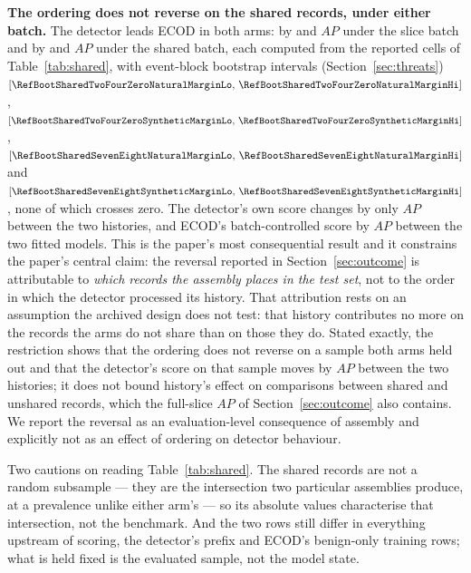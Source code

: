 \documentclass[manuscript,screen,nonacm]{acmart}
\begin{document}
\textbf{The ordering does not reverse on the shared records, under either
batch.} The detector leads ECOD in both arms: by \RevSharedMarginNatural{} and
\RevSharedMarginSynthetic{} $AP$ under the slice batch and by
\RefMarginSharedSevenEightNatural{} and \RefMarginSharedSevenEightSynthetic{} $AP$ under the
shared batch, each computed from the reported cells of
Table~\ref{tab:shared}, with event-block
bootstrap intervals (Section~\ref{sec:threats})
$[\RefBootSharedTwoFourZeroNaturalMarginLo,\,\RefBootSharedTwoFourZeroNaturalMarginHi]$,
$[\RefBootSharedTwoFourZeroSyntheticMarginLo,\,\RefBootSharedTwoFourZeroSyntheticMarginHi]$,
$[\RefBootSharedSevenEightNaturalMarginLo,\,\RefBootSharedSevenEightNaturalMarginHi]$ and
$[\RefBootSharedSevenEightSyntheticMarginLo,\,\RefBootSharedSevenEightSyntheticMarginHi]$, none
of which crosses zero. The detector's own score changes by only
\RevSharedDetectorSpread{} $AP$ between the two histories, and ECOD's
batch-controlled score by \RefEcodSharedSevenEightCrossArmSpread{} $AP$ between the two
fitted models. This is the paper's most consequential result and it constrains
the paper's central claim: the reversal reported in Section~\ref{sec:outcome}
is attributable to \emph{which records the assembly places in the test set},
not to the order in which the detector processed its history. That attribution
rests on an assumption the archived design does not test: that history
contributes no more on the records the arms do not share than on those they
do. Stated exactly, the restriction shows that the ordering does not reverse on
a sample both arms held out and that the detector's score on that sample moves
by \RevSharedDetectorSpread{} $AP$ between the two histories; it does not bound
history's effect on comparisons between shared and unshared records, which the
full-slice $AP$ of Section~\ref{sec:outcome} also contains. We report the
reversal as an evaluation-level consequence of assembly and
explicitly not as an effect of ordering on detector behaviour.

Two cautions on reading Table~\ref{tab:shared}. The shared records are not a
random subsample --- they are the intersection two particular assemblies
produce, at a prevalence unlike either arm's --- so its absolute values
characterise that intersection, not the benchmark. And the two rows still
differ in everything upstream of scoring, the detector's prefix and ECOD's
benign-only training rows; what is held fixed is the evaluated sample, not the
model state.
\end{document}
